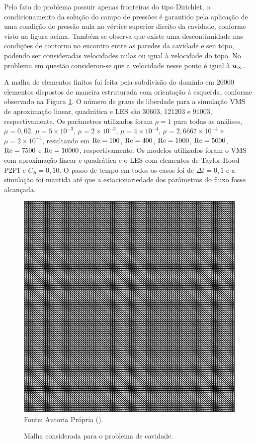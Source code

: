 Pelo fato do problema possuir apenas fronteiras do tipo Dirichlet, o condicionamento da solução do campo de pressões é garantido pela aplicação de uma condição de pressão nula no vértice superior direito da cavidade, conforme visto na figura acima.  Também se observa que existe uma descontinuidade nas condições de contorno no encontro entre as paredes da cavidade e seu topo, podendo ser consideradas velocidades nulas ou igual à velocidade do topo. No problema em questão considerou-se que a velocidade nesse ponto é igual à $\boldsymbol{u}_\infty$.

A malha de elementos finitos foi feita pela subdivisão do domínio em 20000 elementos dispostos de maneira estruturada com orientação à esquerda, conforme observado na Figura \ref{fig:cavity_disc}. O número de graus de liberdade para a simulação VMS de aproximação linear, quadrática e LES são 30603, 121203 e 91003, respectivamente. Os parâmetros utilizados foram $\rho=1$ para todas as análises, $\mu=0,02$, $\mu=5\times10^{-3}$, $\mu=2\times10^{-3}$, $\mu=4\times10^{-4}$, $\mu=2,6667\times10^{-4}$ e $\mu=2\times10^{-4}$, resultando em $\mathrm{Re}=100$, $\mathrm{Re}=400$, $\mathrm{Re}=1000$, $\mathrm{Re}=5000$, $\mathrm{Re}=7500$ e $\mathrm{Re}=10000$, respectivamente. Os modelos utilizados foram o VMS com aproximação linear e quadrática e o LES com elementos de Taylor-Hood P2P1 e $C_S=0,10$. O passo de tempo em todos os casos foi de $\Delta t=0,1$ e a simulação foi mantida até que a estacionariedade dos parâmetros do fluxo fosse alcançada.

\begin{figure}[h]
    \centering
    \caption{Malha considerada para o problema de cavidade.}
    \includegraphics[width=.6\linewidth]{Figuras/Cavity/mesh.pdf}
    \\Fonte: Autoria Própria (\the\year).
    \label{fig:cavity_disc}
\end{figure}

